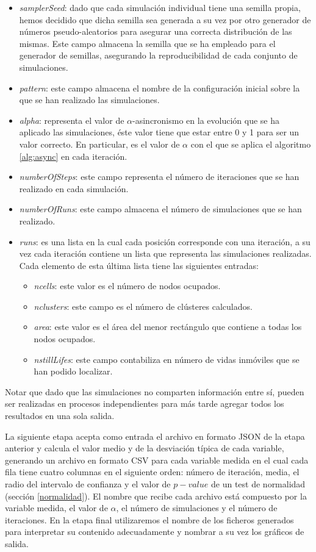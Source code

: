 \documentclass[../proyecto.tex]{memoir}
\begin{document}
\begin{itemize}
\item \textit{samplerSeed}: dado que cada simulación individual tiene una semilla propia, hemos decidido que dicha semilla sea generada a su vez por otro generador de números pseudo-aleatorios para asegurar una correcta distribución de las mismas. Este campo almacena la semilla que se ha empleado para el generador de semillas, asegurando la reproducibilidad de cada conjunto de simulaciones.
\item \textit{pattern}: este campo almacena el nombre de la configuración inicial sobre la que se han realizado las simulaciones.
\item \textit{alpha}: representa el valor de $\alpha$-asincronismo en la evolución que se ha aplicado las simulaciones, éste valor tiene que estar entre 0 y 1 para ser un valor correcto. En particular, es el valor de $\alpha$ con el que se aplica el algoritmo \ref{alg:async} en cada iteración.
\item \textit{numberOfSteps}: este campo representa el número de iteraciones que se han realizado en cada simulación.
\item \textit{numberOfRuns}: este campo almacena el número de simulaciones que se han realizado.
\item \textit{runs}: es una lista en la cual cada posición corresponde con una iteración, a su vez cada iteración contiene un lista que representa las simulaciones realizadas. Cada elemento de esta última lista tiene las siguientes entradas:
\begin{itemize}
	\item \textit{ncells}: este valor es el número de nodos ocupados.
	\item \textit{nclusters}: este campo es el número de clústeres calculados.
	\item \textit{area}: este valor es el área del menor rectángulo que contiene a todas los nodos ocupados.
	\item \textit{nstillLifes}: este campo contabiliza en número de vidas inmóviles que se han podido localizar.
\end{itemize}
\end{itemize}


Notar que dado que las simulaciones no comparten información entre sí, pueden ser realizadas en procesos independientes para más tarde agregar todos los resultados en una sola salida.

La siguiente etapa acepta como entrada el archivo en formato JSON de la etapa anterior y calcula el valor medio y de la desviación típica de cada variable, generando un archivo en formato CSV \cite{csv} para cada variable medida en el cual cada fila tiene cuatro columnas en el siguiente orden: número de iteración, media, el radio del intervalo de confianza y el valor de $p-value$ de un test de normalidad (sección \ref{normalidad}). El nombre que recibe cada archivo está compuesto por la variable medida, el valor de $\alpha$, el número de simulaciones y el número de iteraciones. En la etapa final utilizaremos el nombre de los ficheros generados para interpretar su contenido adecuadamente y nombrar a su vez los gráficos de salida. 
\end{document}
